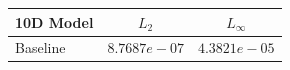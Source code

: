 \begin{table}[ht]
\centering
\begin{tabular}{lcc}
\hline
10D Model & $L_2$ & $L_\infty$ \\
\hline
Baseline & $8.7687e-07$ & $4.3821e-05$ \\
\hline
\end{tabular}
\end{table}
